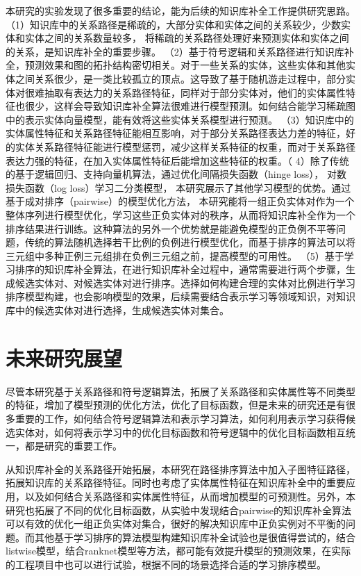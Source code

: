 本研究的实验发现了很多重要的结论，能为后续的知识库补全工作提供研究思路。
（1）知识库中的关系路径是稀疏的，大部分实体和实体之间的关系较少，少数实体和实体之间的关系数量较多，
将稀疏的关系路径处理好来预测实体和实体之间的关系，是知识库补全的重要步骤。
（2）基于符号逻辑和关系路径进行知识库补全，预测效果和图的拓扑结构密切相关。对于一些关系的实体，这些实体和其他实体之间关系很少，是一类比较孤立的顶点。这导致了基于随机游走过程中，部分实体对很难抽取有表达力的关系路径特征，同样对于部分实体对，他们的实体属性特征也很少，这样会导致知识库补全算法很难进行模型预测。如何结合能学习稀疏图中的表示实体向量模型，能有效将这些实体关系模型进行预测。
（3）知识库中的实体属性特征和关系路径特征能相互影响，对于部分关系路径表达力差的特征，好的实体关系路径特征能进行模型惩罚，减少这样关系特征的权重，而对于关系路径表达力强的特征，在加入实体属性特征后能增加这些特征的权重。（
4）除了传统的基于逻辑回归、支持向量机算法，通过优化间隔损失函数（hinge loss），
对数损失函数（log loss）学习二分类模型，
本研究展示了其他学习模型的优势。通过基于成对排序（pairwise）的模型优化方法，
本研究能将一组正负实体对作为一个整体序列进行模型优化，学习这些正负实体对的秩序，从而将知识库补全作为一个排序结果进行训练。这种算法的另外一个优势就是能避免模型的正负例不平等问题，传统的算法随机选择若干比例的负例进行模型优化，而基于排序的算法可以将三元组中多种正例三元组排在负例三元组之前，提高模型的可用性。
（5）基于学习排序的知识库补全算法，在进行知识库补全过程中，通常需要进行两个步骤，生成候选实体对、对候选实体对进行排序。选择如何构建合理的实体对比例进行学习排序模型构建，也会影响模型的效果，后续需要结合表示学习等领域知识，对知识库中的候选实体对进行选择，生成候选实体对集合。

\section{未来研究展望}
尽管本研究基于关系路径和符号逻辑算法，拓展了关系路径和实体属性等不同类型的特征，增加了模型预测的优化方法，优化了目标函数，但是未来的研究还是有很多重要的工作，如何结合符号逻辑算法和表示学习算法，如何利用表示学习获得候选实体对，如何将表示学习中的优化目标函数和符号逻辑中的优化目标函数相互统一，都是研究的重要工作。

从知识库补全的关系路径开始拓展，本研究在路径排序算法中加入子图特征路径，拓展知识库的关系路径特征。同时也考虑了实体属性特征在知识库补全中的重要应用，以及如何结合关系路径和实体属性特征，从而增加模型的可预测性。另外，本研究也拓展了不同的优化目标函数，从实验中发现结合pairwise的知识库补全算法可以有效的优化一组正负实体对集合，很好的解决知识库中正负实例对不平衡的问题。而其他基于学习排序的算法模型构建知识库补全试验也是很值得尝试的，结合listwise模型，结合ranknet模型等方法，都可能有效提升模型的预测效果，在实际的工程项目中也可以进行试验，根据不同的场景选择合适的学习排序模型。

